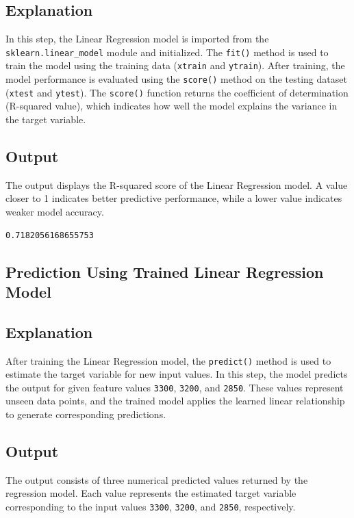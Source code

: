 \documentclass[11pt]{article}
\makeatletter
\newcommand{\boxspacing}{\kern\kvtcb@left@rule\kern\kvtcb@boxsep}
\newcommand{\prompt}[4]{
        {\ttfamily\llap{{\color{#2}[#3]:\hspace{3pt}#4}}\vspace{-\baselineskip}}
    }
\makeatother
\begin{document}
\subsection*{Explanation}
In this step, the Linear Regression model is imported from the \texttt{sklearn.linear\_model} module and initialized. The \texttt{fit()} method is used to train the model using the training data (\texttt{xtrain} and \texttt{ytrain}). After training, the model performance is evaluated using the \texttt{score()} method on the testing dataset (\texttt{xtest} and \texttt{ytest}). The \texttt{score()} function returns the coefficient of determination (R-squared value), which indicates how well the model explains the variance in the target variable.

\subsection*{Output}
The output displays the R-squared score of the Linear Regression model. A value closer to 1 indicates better predictive performance, while a lower value indicates weaker model accuracy.

            \begin{tcolorbox}[breakable, size=fbox, boxrule=.5pt, pad at break*=1mm, opacityfill=0]
\prompt{Out}{outcolor}{14}{\boxspacing}
\begin{Verbatim}[commandchars=\\\{\}]
0.7182056168655753
\end{Verbatim}
\end{tcolorbox}
        

\subsection{Prediction Using Trained Linear Regression Model}

\subsection*{Explanation}
After training the Linear Regression model, the \texttt{predict()} method is used to estimate the target variable for new input values. In this step, the model predicts the output for given feature values \texttt{3300}, \texttt{3200}, and \texttt{2850}. These values represent unseen data points, and the trained model applies the learned linear relationship to generate corresponding predictions.

\subsection*{Output}
The output consists of three numerical predicted values returned by the regression model. Each value represents the estimated target variable corresponding to the input values \texttt{3300}, \texttt{3200}, and \texttt{2850}, respectively.
\end{document}
